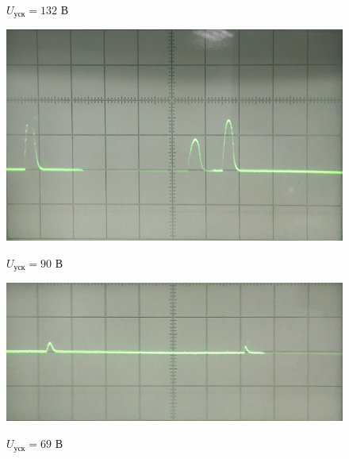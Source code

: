 \begin{figure}[h]
\begin{minipage}[h]{0.45\linewidth}
		\caption{$U_{\text{уск}}=132$ В}
		\label{fig:img4}
	\end{minipage}
	\hfill
	\begin{minipage}[h]{0.45\textwidth}
		\centering
		{\includegraphics[width=\textwidth]{img/img5}}
		\caption{$U_{\text{уск}}=90$ В}
		\label{fig:img5}
	\end{minipage}

		\begin{minipage}[h]{0.45\textwidth}
		\centering
		{\includegraphics[width=\textwidth]{img/img6}}
		\caption{$U_{\text{уск}}=69$ В}
		\label{fig:img6}
	\end{minipage}
\end{figure}
\newpage


